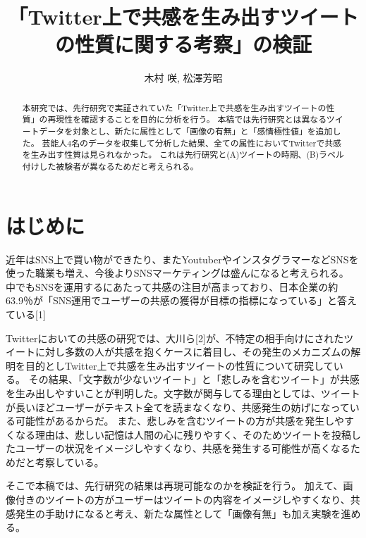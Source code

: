 \documentclass[dvipdfmx]{issj}
\title{「Twitter上で共感を生み出すツイートの性質に関する考察」の検証}
\author{木村 咲\uddag, 松澤芳昭\uddag}
\affiliation{\dag 青山学院大学　社会情報情報学部\ddag }
\begin{document}
\maketitle
\begin{abstract}
本研究では、先行研究で実証されていた「Twitter上で共感を生み出すツイートの性質」の再現性を確認することを目的に分析を行う。 本稿では先行研究とは異なるツイートデータを対象とし、新たに属性として「画像の有無」と「感情極性値」を追加した。 芸能人4名のデータを収集して分析した結果、全ての属性においてTwitterで共感を生み出す性質は見られなかった。 これは先行研究と(A)ツイートの時期、(B)ラベル付けした被験者が異なるためだと考えられる。
\end{abstract}
\section{はじめに} %

近年はSNS上で買い物ができたり、またYoutuberやインスタグラマーなどSNSを使った職業も増え、今後よりSNSマーケティングは盛んになると考えられる。
中でもSNSを運用するにあたって共感の注目が高まっており、日本企業の約63.9％が「SNS運用でユーザーの共感の獲得が目標の指標になっている」と答えている[1]

Twitterにおいての共感の研究では、大川ら[2]が、不特定の相手向けにされたツイートに対し多数の人が共感を抱くケースに着目し、その発生のメカニズムの解明を目的としTwitter上で共感を生み出すツイートの性質について研究している。
その結果、「文字数が少ないツイート」と「悲しみを含むツイート」が共感を生み出しやすいことが判明した。文字数が関与してる理由としては、ツイートが長いほどユーザーがテキスト全てを読まなくなり、共感発生の妨げになっている可能性があるからだ。
また、悲しみを含むツイートの方が共感を発生しやすくなる理由は、悲しい記憶は人間の心に残りやすく、そのためツイートを投稿したユーザーの状況をイメージしやすくなり、共感を発生する可能性が高くなるためだと考察している。

そこで本稿では、先行研究の結果は再現可能なのかを検証を行う。
加えて、画像付きのツイートの方がユーザーはツイートの内容をイメージしやすくなり、共感発生の手助けになると考え、新たな属性として「画像有無」も加え実験を進める。




\end{document}
